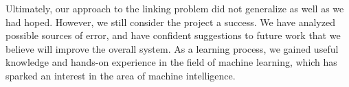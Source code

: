 
Ultimately, our approach to the linking problem did not generalize as well as we had hoped. However, we still consider the project a success. We have analyzed possible sources of error, and have confident suggestions to future work that we believe will improve the overall system. As a learning process, we gained useful knowledge and hands-on experience in the field of machine learning, which has sparked an interest in the area of machine intelligence. 



